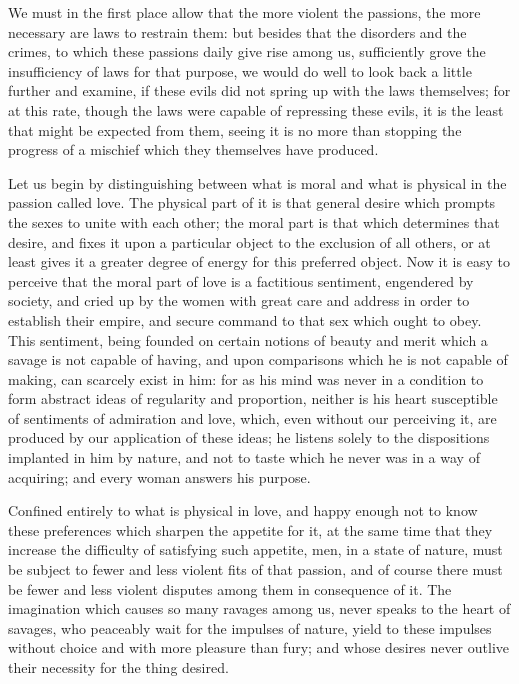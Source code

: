 \documentclass[11pt,twocolumn]{ltugboat}
\begin{document}
We must in the first place allow that the more violent the passions,
the more necessary are laws to restrain them: but besides that the
disorders and the crimes, to which these passions daily give rise
among us, sufficiently grove the insufficiency of laws for that
purpose, we would do well to look back a little further and examine,
if these evils did not spring up with the laws themselves; for at this
rate, though the laws were capable of repressing these evils, it is
the least that might be expected from them, seeing it is no more than
stopping the progress of a mischief which they themselves have
produced.

Let us begin by distinguishing between what is moral and what is
physical in the passion called love. The physical part of it is that
general desire which prompts the sexes to unite with each other; the
moral part is that which determines that desire, and fixes it upon a
particular object to the exclusion of all others, or at least gives it
a greater degree of energy for this preferred object. Now it is easy
to perceive that the moral part of love is a factitious sentiment,
engendered by society, and cried up by the women with great care and
address in order to establish their empire, and secure command to that
sex which ought to obey. This sentiment, being founded on certain
notions of beauty and merit which a savage is not capable of having,
and upon comparisons which he is not capable of making, can scarcely
exist in him: for as his mind was never in a condition to form
abstract ideas of regularity and proportion, neither is his heart
susceptible of sentiments of admiration and love, which, even without
our perceiving it, are produced by our application of these ideas; he
listens solely to the dispositions implanted in him by nature, and not
to taste which he never was in a way of acquiring; and every woman
answers his purpose.

Confined entirely to what is physical in love, and happy enough not to
know these preferences which sharpen the appetite for it, at the same
time that they increase the difficulty of satisfying such appetite,
men, in a state of nature, must be subject to fewer and less violent
fits of that passion, and of course there must be fewer and less
violent disputes among them in consequence of it. The imagination
which causes so many ravages among us, never speaks to the heart of
savages, who peaceably wait for the impulses of nature, yield to these
impulses without choice and with more pleasure than fury; and whose
desires never outlive their necessity for the thing desired.
\end{document}
